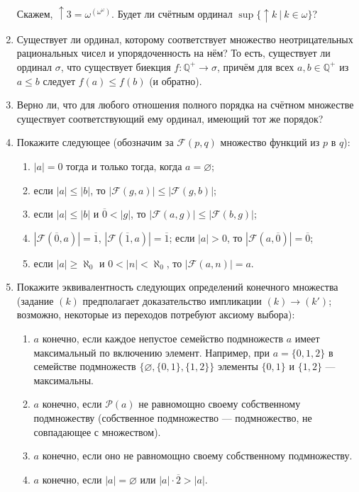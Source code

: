 \documentclass[10pt,a4paper,oneside]{article}
\begin{document}
\begin{enumerate}
Скажем, $\uparrow 3 = \omega^{\left(\omega^\omega\right)}$. Будет ли счётным ординал $\sup\{\uparrow k\ |\ k \in \omega\}$?
\item Существует ли ординал, которому соответствует множество неотрицательных рациональных чисел и упорядоченность на нём?
То есть, существует ли ординал $\sigma$, что существует биекция $f: \mathbb{Q^+} \rightarrow \sigma$, причём
для всех $a,b \in \mathbb{Q^+}$ из $a \le b$ следует $f(a) \le f(b)$ (и обратно).
\item Верно ли, что для любого отношения полного порядка на счётном множестве существует соответствующий ему ординал,
имеющий тот же порядок?
\item Покажите следующее (обозначим за $\mathcal{F}(p,q)$ множество функций из $p$ в $q$):
\begin{enumerate}
\item $|a|=0$ тогда и только тогда, когда $a = \varnothing$;
\item если $|a|\le|b|$, то $|\mathcal{F}(g,a)| \le |\mathcal{F}(g,b)|$;
\item если $|a|\le|b|$ и $\overline{0}<|g|$, то $|\mathcal{F}(a,g)| \le |\mathcal{F}(b,g)|$;
\item $|\mathcal{F}(\overline{0},a)| = \overline{1}$, $|\mathcal{F}(\overline{1},a)| = \overline{1}$; если $|a| > 0$, то $|\mathcal{F}(a,\overline{0})| = \overline{0}$;
\item если $|a|\ge\aleph_0$ и $0 < |n| < \aleph_0$, то $|\mathcal{F}(a,n)| = a$.
\end{enumerate}
\item Покажите эквивалентность следующих определений конечного множества (задание $(k)$ предполагает доказательство
импликации $(k)\rightarrow(k')$; возможно, некоторые из переходов потребуют аксиому выбора):
\begin{enumerate}
\item $a$ конечно, если каждое непустое семейство подмножеств $a$ имеет максимальный по включению элемент.
Например, при $a = \{0,1,2\}$ в семействе подмножеств $\{\varnothing,\{0,1\},\{1,2\}\}$ элементы $\{0,1\}$ и $\{1,2\}$ --- максимальны.
\item $a$ конечно, если $\mathcal{P}(a)$ не равномощно своему собственному подмножеству (собственное подмножество --- подмножество, не совпадающее с множеством).
\item $a$ конечно, если оно не равномощно своему собственному подмножеству.
\item $a$ конечно, если $|a|=\varnothing$ или $|a|\cdot\overline{2} > |a|$.

\end{enumerate}
\end{enumerate}
\end{document}
